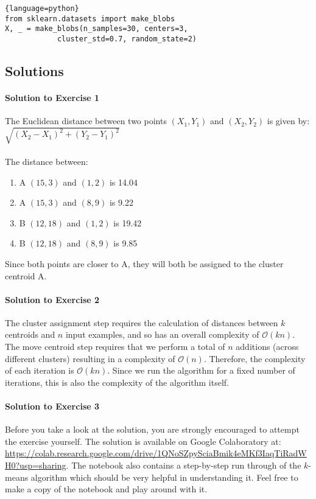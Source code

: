 \begin{lstlisting}{language=python}
from sklearn.datasets import make_blobs
X, _ = make_blobs(n_samples=30, centers=3, 
            cluster_std=0.7, random_state=2)
\end{lstlisting}

\subsection{Solutions}

\paragraph{Solution to Exercise 1}

The Euclidean distance between two points $(X_1, Y_1)$ and $(X_2, Y_2)$ is given by: $\sqrt{ (X_2 - X_1)^2 + (Y_2 - Y_1)^2 }$
\\ \\
The distance between: 
\begin{enumerate}
\item A $(15, 3)$  and $(1, 2)$ is 14.04
\item A $(15, 3)$  and $(8, 9)$ is 9.22
\item B $(12, 18)$ and $(1, 2)$ is 19.42
\item B $(12, 18)$ and $(8, 9)$ is 9.85
\end{enumerate}

Since both points are closer to A, they will both be assigned to the cluster centroid A. 

\paragraph{Solution to Exercise 2}

The cluster assignment step requires the calculation of distances between $k$ centroids and $n$ input examples, and so has an overall complexity of $\mathcal{O}(kn)$. The move centroid step requires that we perform a total of $n$ additions (across different clusters) resulting in a complexity of $\mathcal{O}(n)$. Therefore, the complexity of each iteration is $\mathcal{O}(kn)$. Since we run the algorithm for a fixed number of iterations, this is also the complexity of the algorithm itself.

\paragraph{Solution to Exercise 3}
Before you take a look at the solution, you are strongly encouraged to attempt the exercise yourself. The solution is available on Google Colaboratory at: { \footnotesize
\url{https://colab.research.google.com/drive/1QNoSZpySciaBmik4eMKf3IaqTiRadWH0?usp=sharing}. 
} The notebook also contains a step-by-step run through of the $k$-means algorithm which should be very helpful in understanding it. Feel free to make a copy of the notebook and play around with it. 



